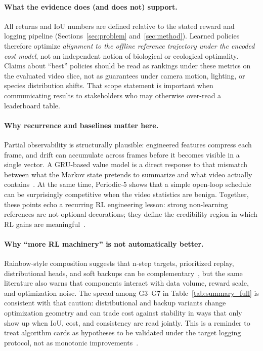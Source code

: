 \documentclass[letterpaper]{article}
\begin{document}
\paragraph{What the evidence does (and does not) support.}
All returns and IoU numbers are defined relative to the stated reward and logging pipeline (Sections~\ref{sec:problem} and~\ref{sec:method}). Learned policies therefore optimize \emph{alignment to the offline reference trajectory under the encoded cost model}, not an independent notion of biological or ecological optimality. Claims about ``best'' policies should be read as rankings under these metrics on the evaluated video slice, not as guarantees under camera motion, lighting, or species distribution shifts. That scope statement is important when communicating results to stakeholders who may otherwise over-read a leaderboard table.

\paragraph{Why recurrence and baselines matter here.}
Partial observability is structurally plausible: engineered features compress each frame, and drift can accumulate across frames before it becomes visible in a single vector. A GRU-based value model is a direct response to that mismatch between what the Markov state pretends to summarize and what video actually contains~\cite{hausknecht2015drqn}. At the same time, Periodic-5 shows that a simple open-loop schedule can be surprisingly competitive when the video statistics are benign. Together, these points echo a recurring RL engineering lesson: strong non-learning references are not optional decorations; they define the credibility region in which RL gains are meaningful~\cite{sb3,cleanrldocs}.

\paragraph{Why ``more RL machinery'' is not automatically better.}
Rainbow-style composition suggests that n-step targets, prioritized replay, distributional heads, and soft backups can be complementary~\cite{hessel2018rainbow}, but the same literature also warns that components interact with data volume, reward scale, and optimization noise. The spread among G3--G7 in Table~\ref{tab:summary_full} is consistent with that caution: distributional and backup variants change optimization geometry and can trade cost against stability in ways that only show up when IoU, cost, and consistency are read jointly. This is a reminder to treat algorithm cards as hypotheses to be validated under the target logging protocol, not as monotonic improvements~\cite{bellemare2017distributional,schaul2015per}.
\end{document}

